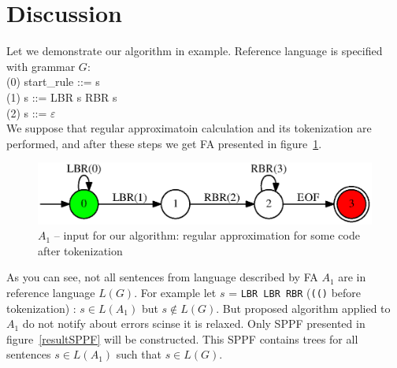 \section{Discussion}

Let we demonstrate our algorithm in example. Reference language is specified with grammar $G$:\\
(0) start\_rule ::= s \\
(1) s ::= LBR s RBR s\\
(2) s ::= $\varepsilon$ \\

We suppose that regular approximatoin calculation and its tokenization are performed, and after these steps we get FA presented in figure~\ref{faApprox}. 


\begin{figure}
    \begin{center}
        \includegraphics[scale=0.5]{dot/in3.eps}
    \end{center}
    \caption{$A_1$ -- input for our algorithm: regular approximation for some code after tokenization} 
    \label{faApprox}
\end{figure}

As you can see, not all sentences from language described by FA $A_1$ are in reference language $L(G)$.
For example let $s$ = \verb|LBR LBR RBR| (\verb|(()| before tokenization) : $s \in L(A_1)$ but $s \notin L(G)$.
But proposed algorithm applied to $A_1$ do not notify about errors scinse it is relaxed. Only SPPF presented in figure~\ref{resultSPPF} will be constructed.
This SPPF contains trees for all sentences $s \in L(A_1)$ such that $s \in L(G)$.

